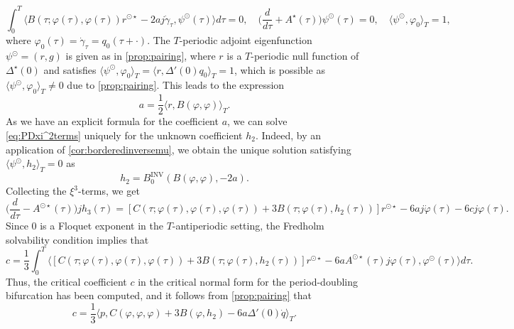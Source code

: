 \documentclass[english]{myarticle}
\DeclareMathOperator{\inv}{INV}
\begin{document}
\begin{sloppypar}
\begin{equation*}
    \int_0^{T} \langle B(\tau; \varphi(\tau),\varphi(\tau))r^{\odot \star} - 2a j\dot{\gamma}_\tau, \psi^{\odot}(\tau) \rangle  d\tau = 0, \quad \bigg(\frac{d}{d \tau} + A^\star(\tau) \bigg)\psi^{\odot}(\tau) = 0, \quad \langle \psi^\odot, \varphi_0 \rangle_T = 1,
\end{equation*}
where $\varphi_0(\tau) = \dot{\gamma}_\tau = q_0(\tau + \cdot)$. The $T$-periodic adjoint eigenfunction $\psi^\odot = (r,g)$ is given as in \cref{prop:pairing}, where $r$ is a $T$-periodic null function of $\Delta^\star(0)$ and satisfies $\langle \psi^\odot,\varphi_0 \rangle_T = \langle r, \Delta'(0)q_0 \rangle_T = 1$, which is possible as $\langle \psi^{\odot},\varphi_0 \rangle_T \neq 0$ due to \cref{prop:pairing}. This leads to the expression
\begin{equation} \label{eq:pdcoeffa}
    a = \frac{1}{2} \langle r, B(\varphi,\varphi) \rangle_T.
\end{equation}
As we have an explicit formula for the coefficient $a$, we can solve \eqref{eq:PDxi^2terms} uniquely for the unknown coefficient $h_2$. Indeed, by an application of \cref{cor:borderedinversemu}, we obtain the unique solution satisfying $\langle \psi^\odot, h_2 \rangle_T = 0$ as
\begin{equation*}
h_2 = B_{0}^{\inv}(B(\varphi,\varphi), -2a).
\end{equation*}
Collecting the $\xi^3$-terms, we get
\begin{equation*} 
    \bigg (\frac{d}{d \tau} - A^{\odot \star}(\tau) \bigg) jh_3(\tau) = [C(\tau;\varphi(\tau),\varphi(\tau),\varphi(\tau)) + 3 B(\tau;\varphi(\tau),h_2(\tau))]r^{\odot \star} -6aj\dot{\varphi}(\tau) - 6c j\varphi(\tau).
\end{equation*}
Since $0$ is a Floquet exponent in the $T$-antiperiodic setting, the Fredholm solvability condition implies that
\begin{equation*} 
    c = \frac{1}{3} \int_0^{T} \langle [C(\tau;\varphi(\tau),\varphi(\tau),\varphi(\tau)) + 3 B(\tau;\varphi(\tau),h_2(\tau))]r^{\odot \star} - 6aA^{\odot \star}(\tau)j\varphi(\tau), \varphi^{\odot}(\tau) \rangle d\tau.
\end{equation*}
Thus, the critical coefficient $c$ in the critical normal form for the period-doubling bifurcation has been computed, and it follows from \cref{prop:pairing} that 
\begin{equation} \label{eq:normalformcoeff pd}
    c = \frac{1}{3} \langle p, C(\varphi,\varphi,\varphi) + 3 B(\varphi,h_2) -6a \Delta'(0)\dot{q} \rangle_T.
\end{equation}


\end{sloppypar}
\end{document}
